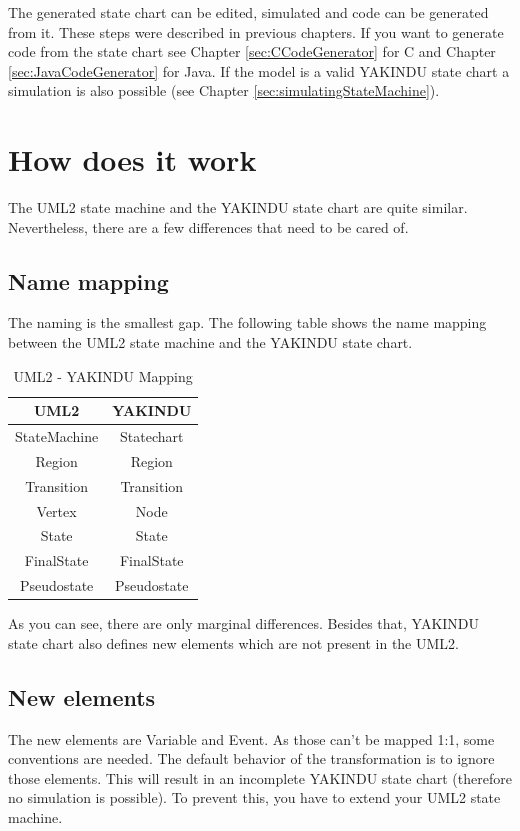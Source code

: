 The generated state chart can be edited, simulated and code can be generated
from it. These steps were described in previous chapters. If you want to
generate code from the state chart see Chapter \ref{sec:CCodeGenerator} for C
and Chapter \ref{sec:JavaCodeGenerator} for Java. If the model is a valid
YAKINDU state chart a simulation is also possible (see Chapter
\ref{sec:simulatingStateMachine}).

\section{How does it work}
The UML2 state machine and the YAKINDU state chart are quite similar.
Nevertheless, there are a few differences that need to be cared of.

\subsection{Name mapping}
The naming is the smallest gap. The following table shows the name mapping
between the UML2 state machine and the YAKINDU state chart.

\begin{table}[ht]
\begin{center}
\begin{tabular}{|c|c|}
\hline UML2 & YAKINDU \\
\hline
StateMachine & Statechart \\
Region & Region \\
Transition & Transition \\
Vertex & Node \\
State &  State \\
FinalState & FinalState \\
Pseudostate & Pseudostate \\
\hline
\end{tabular}
\end{center}
\caption{UML2 - YAKINDU Mapping}
\label{UML2 - YAKINDU Mapping}
\end{table}

As you can see, there are only marginal differences. Besides that, YAKINDU state
chart also defines new elements which are not present in the UML2.

\subsection{New elements}
The new elements are Variable and Event. As those can't be mapped 1:1, some
conventions are needed. The default behavior of the transformation is to ignore
those elements. This will result in an incomplete YAKINDU state chart (therefore
no simulation is possible). To %
prevent this, you have to extend your UML2 state machine.


